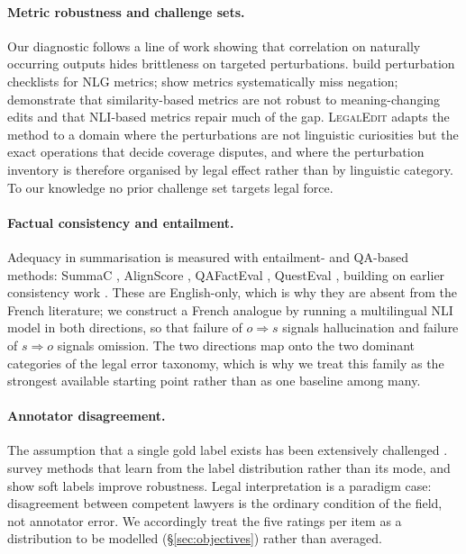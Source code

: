 \documentclass[11pt]{article}
\begin{document}
\paragraph{Metric robustness and challenge sets.}
Our diagnostic follows a line of work showing that correlation on naturally
occurring outputs hides brittleness on targeted perturbations.
\citet{sai2021perturbation} build perturbation checklists for NLG metrics;
\citet{anschutz2023negation} show metrics systematically miss negation;
\citet{chen2023menli} demonstrate that similarity-based metrics are not robust
to meaning-changing edits and that NLI-based metrics repair much of the gap.
\textsc{LegalEdit} adapts the method to a domain where the perturbations are not
linguistic curiosities but the exact operations that decide coverage disputes,
and where the perturbation inventory is therefore organised by legal effect
rather than by linguistic category. To our knowledge no prior challenge set
targets legal force.

\paragraph{Factual consistency and entailment.}
Adequacy in summarisation is measured with entailment- and QA-based methods:
SummaC \citep{laban2022summac}, AlignScore \citep{zha2023alignscore},
QAFactEval \citep{fabbri2022qafacteval}, QuestEval \citep{rebuffel2021questeval},
building on earlier consistency work \citep{laban2020summary,hayes2007answering}.
These are English-only, which is why they are absent from the French literature;
we construct a French analogue by running a multilingual NLI model
\citep{laurer2024nli,conneau2020xlmr} in both directions, so that failure of
$o \Rightarrow s$ signals hallucination and failure of $s \Rightarrow o$ signals
omission. The two directions map onto the two dominant categories of the legal
error taxonomy, which is why we treat this family as the strongest available
starting point rather than as one baseline among many.

\paragraph{Annotator disagreement.}
The assumption that a single gold label exists has been extensively challenged
\citep{pavlick2019inherent,plank2022problem}. \citet{uma2021learning} survey
methods that learn from the label distribution rather than its mode, and
\citet{peterson2019human} show soft labels improve robustness. Legal
interpretation is a paradigm case: disagreement between competent lawyers is the
ordinary condition of the field, not annotator error. We accordingly treat the
five ratings per item as a distribution to be modelled (\S\ref{sec:objectives})
rather than averaged.
\end{document}
